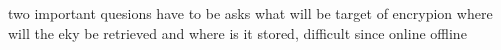 

two important quesions have to be asks
what will be target of encrypion
where will the eky be retrieved and where is it stored, difficult since online offline
